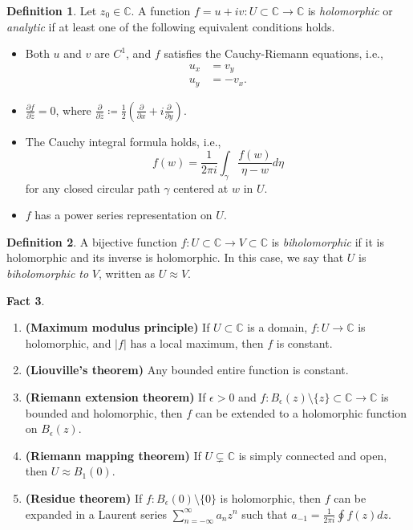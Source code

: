 \documentclass[10pt,letterpaper,cm]{nupset}
\theoremstyle{definition}
\newtheorem{defn}{Definition}[subsection]
\theoremstyle{theorem}
\newtheorem{fact}[defn]{Fact}
\theoremstyle{remark}
\newcommand{\C}{\mathbb C}
\newcommand{\1}{\mathbb{1}}
\newcommand{\0}{\vec 0}
\newcommand{\bi}{\begin{itemize}}
\newcommand{\ei}{\end{itemize}}
\newcommand{\be}{\begin{enumerate}}
\newcommand{\ee}{\end{enumerate}}
\begin{document}
\begin{defn}
Let $z_0\in \C$. A function $f = u+iv : U\subset \C \to \C$ is \textit{holomorphic} or \textit{analytic} if at least one of  the following equivalent conditions holds.
\bi
\item Both $u$ and $v$ are $C^1$, and $f$ satisfies the Cauchy-Riemann equations, i.e., 
\begin{align*}
u_x & = v_y
\\ u_y & = {-v_x}.
\end{align*}
\item $\frac{\partial{f}}{\partial{\bar{z}}} =0$, where $\frac{\partial}{\partial{\bar{z}}} \coloneqq \frac{1}{2}\left(\frac{\partial}{\partial{x}} + i\frac{\partial}{\partial{y}}\right ) .$
\item The Cauchy integral formula holds, i.e., 
\[f(w) = \frac{1}{2\pi i}\int_{\gamma}\frac{f(w)}{\eta -w}d{\eta}
\] for any closed circular path $\gamma$ centered at $w$ in $U$. 
\item $f$ has a power series representation on $U$.
\ei
\end{defn}

\smallskip

\begin{defn}
A bijective function $f: U \subset \C \to V \subset \C$ is \textit{biholomorphic} if it is holomorphic and its inverse is holomorphic. In this case, we say that $U$ is \textit{biholomorphic to} $V$, written as $U \approx V$.
\end{defn}

\begin{fact}\label{singfacts} $ $
\be[label = (\alph*)]
\item{\textbf{(Maximum modulus principle)}} If $U\subset \C$ is a domain, $f: U \to \C$ is holomorphic, and $\lvert{f}\rvert$ has a local maximum, then $f$ is constant. 
\item{\textbf{(Liouville's theorem)}} Any bounded entire function is constant. 
\item{\textbf{(Riemann extension theorem)}} If $\epsilon >0$ and $f: B_{\epsilon}(z) \setminus \{z\} \subset \C \to \C$ is bounded and holomorphic, then $f$ can be extended to a holomorphic function on $B_{\epsilon}(z)$.
\item{\textbf{(Riemann mapping theorem)}} If $U\subsetneq \C$ is simply connected and open, then $U\approx B_1(0)$. 
\item{\textbf{(Residue theorem)}} If $f: B_{\epsilon}(0)\setminus \{0\}$ is holomorphic, then $f$ can be expanded in a Laurent series
$\sum_{n={-\infty}}^{\infty}a_nz^n$ such that $a_{-1} = \frac{1}{2\pi i}\oint f(z)d{z}$.
\ee
\end{fact}
\end{document}
